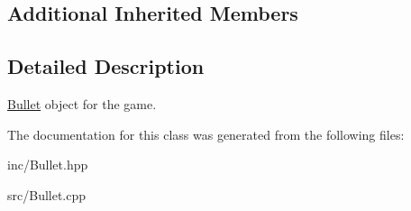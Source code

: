 \subsection*{Additional Inherited Members}


\subsection{Detailed Description}
\hyperlink{class_bullet}{Bullet} object for the game. 

The documentation for this class was generated from the following files\+:\begin{DoxyCompactItemize}
\item 
inc/Bullet.\+hpp\item 
src/Bullet.\+cpp\end{DoxyCompactItemize}
